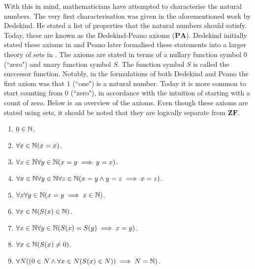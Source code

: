 \documentclass[../main.tex]{subfiles}
\begin{document}
With this in mind, mathematicians have attempted to characterise the natural numbers. The very first characterisation was given in the aforementioned work by Dedekind. He stated a list of properties that the natural numbers should satisfy. Today, these are known as the Dedekind-Peano axioms ($\mathbf{PA}$). Dedekind initially stated these axioms in \cite{Dedekind1888} and Peano later formalised these statements into a larger theory of sets in \cite{Peano1889}. The axioms are stated in terms of a nullary function symbol $0$ (``zero") and unary function symbol $S$. The function symbol $S$ is called the successor function. Notably, in the formulations of both Dedekind and Peano the first axiom was that $1$ (``one") is a natural number. Today it is more common to start counting from $0$ (``zero"), in accordance with the intuition of starting with a count of zero. Below is an overview of the axioms. Even though these axioms are stated using sets, it should be noted that they are logically separate from $\mathbf{ZF}$.
\begin{enumerate}[label=PA\arabic*]
    \item\label{itm:the_natural_numbers_integers_and_rational_numbers:peano_1} $0\in\mathbb{N}$.
    \item\label{itm:the_natural_numbers_integers_and_rational_numbers:peano_2} $\forall x\in\mathbb{N}(x=x)$.
    \item\label{itm:the_natural_numbers_integers_and_rational_numbers:peano_3} $\forall x\in\mathbb{N}\forall y\in\mathbb{N}(x=y\implies y=x)$.
    \item\label{itm:the_natural_numbers_integers_and_rational_numbers:peano_4} $\forall x\in\mathbb{N}\forall y\in\mathbb{N}\forall z\in\mathbb{N}(x=y\land y=z\implies x=z)$.
    \item\label{itm:the_natural_numbers_integers_and_rational_numbers:peano_5} $\forall x\forall y\in\mathbb{N}(x=y\implies x\in\mathbb{N})$.
    \item\label{itm:the_natural_numbers_integers_and_rational_numbers:peano_6} $\forall x\in\mathbb{N}(S(x)\in\mathbb{N})$.
    \item\label{itm:the_natural_numbers_integers_and_rational_numbers:peano_7} $\forall x\in\mathbb{N}\forall y\in\mathbb{N}(S(x)=S(y)\implies x=y)$.
    \item\label{itm:the_natural_numbers_integers_and_rational_numbers:peano_8} $\forall x\in\mathbb{N}(S(x)\neq0)$.
    \item\label{itm:the_natural_numbers_integers_and_rational_numbers:peano_9} $\forall N((0\in N\land\forall x\in N(S(x)\in N))\implies N=\mathbb{N})$.
\end{enumerate}
\end{document}
